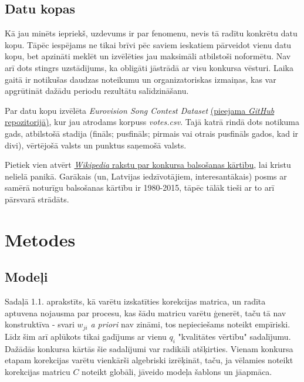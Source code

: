 \documentclass[12pt, a4paper]{article}
\numberwithin{equation}{section} %
\begin{document}
\subsection{Datu kopas}

Kā jau minēts iepriekš, uzdevums ir par fenomenu, nevis tā radītu konkrētu datu kopu. Tāpēc iespējams ne tikai brīvi pēc saviem ieskatiem pārveidot vienu datu kopu, bet apzināti meklēt un izvēlēties jau maksimāli atbilstoši noformētu. Nav arī dots stingrs uzstādījums, ka obligāti jāstrādā ar visu konkursa vēsturi. Laika gaitā ir notikušas daudzas noteikumu un organizatoriskas izmaiņas, kas var apgrūtināt dažādu periodu rezultātu salīdzināšanu.

Par datu kopu izvēlēta \textit{Eurovision Song Contest Dataset} \href{https://github.com/Spijkervet/eurovision-dataset}{(pieejama \textit{GitHub} repozitorijā)}, kur jau atrodams korpuss \textit{votes.csv}. Tajā katrā rindā dots notikuma gads, atbilstošā stadija (fināls; pusfināls; pirmais vai otrais pusfināls gados, kad ir divi), vērtējošā valsts un punktus saņemošā valsts. 

Pietiek vien atvērt \href{https://en.wikipedia.org/wiki/Voting_at_the_Eurovision_Song_Contest}{\textit{Wikipedia} rakstu par konkursa balsošanas kārtību}, lai kristu nelielā panikā. Garākais (un, Latvijas iedzīvotājiem, interesantākais) posms ar samērā noturīgu balsošanas kārtību ir 1980-2015, tāpēc tālāk tieši ar to arī pārsvarā strādāts.

\newpage
\section{Metodes}

\subsection{Modeļi}

Sadaļā 1.1. aprakstīts, kā varētu izskatīties korekcijas matrica, un radīta aptuvena nojausma par procesu, kas šādu matricu varētu ģenerēt, taču tā nav konstruktīva - svari $w_{ji}$ \textit{a priori} nav zināmi, tos nepieciešams noteikt empīriski. Līdz šim arī aplūkots tikai gadījums ar vienu $q_i$ "kvalitātes vērtību" sadalījumu. Dažādās konkursa kārtās šie sadalījumi var radikāli atšķirties. Vienam konkursa etapam korekcijas varētu vienkārši algebriski izrēķināt, taču, ja vēlamies noteikt korekcijas matricu $C$ noteikt globāli, jāveido modeļa šablons un jāapmāca.
\end{document}
